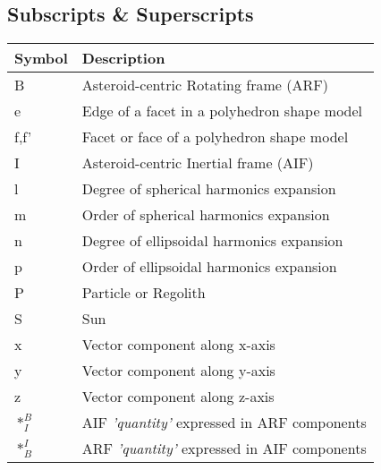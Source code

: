 \subsection*{Subscripts \& Superscripts}
\begin{longtable}[l]{p{100pt} p{250pt}}
    \textbf{Symbol} & \textbf{Description}                                              \\
    \hline
    B                                 & Asteroid-centric Rotating frame (ARF)           \\
    e                                 & Edge of a facet in a polyhedron shape model     \\
    f,f'                              & Facet or face of a polyhedron shape model       \\
    I                                 & Asteroid-centric Inertial frame (AIF)           \\
    l                                 & Degree of spherical harmonics expansion         \\
    m                                 & Order of spherical harmonics expansion          \\
    n                                 & Degree of ellipsoidal harmonics expansion       \\
    p                                 & Order of ellipsoidal harmonics expansion        \\
    P                                 & Particle or Regolith                            \\
    S                                 & Sun                                             \\
    x                                 & Vector component along x-axis                   \\
    y                                 & Vector component along y-axis                   \\
    z                                 & Vector component along z-axis                   \\
    $\ast_{I}^{B}$                    & AIF \textit{'quantity'} expressed
                                        in ARF components                               \\
    $\ast_{B}^{I}$                    & ARF \textit{'quantity'} expressed
                                        in AIF components                               \\
\end{longtable}
